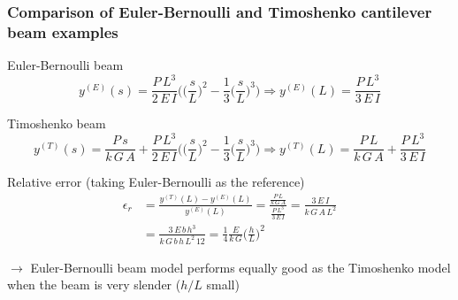 \begin{frame}
  \frametitle{Comparison of Euler-Bernoulli and Timoshenko cantilever beam examples}
  
  Euler-Bernoulli beam
  \begin{displaymath}
    y^{(E)}(s) = \frac{P \, L^3}{2 \, E \, I} \Biggl( \biggl( \frac{s}{L} \biggr)^2 - \frac{1}{3} \biggl( \frac{s}{L} \biggr)^3 \Biggr)
    \Rightarrow y^{(E)}(L) = \frac{P \, L^3}{3 \, E \, I}
  \end{displaymath}
  
  Timoshenko beam
  \begin{displaymath}
    y^{(T)}(s) = \frac{P \, s}{k \, G \, A} + \frac{P \, L^3}{2 \, E \, I} \Biggl( 
      \biggl( \frac{s}{L} \biggr)^2 - \frac{1}{3} \biggl( \frac{s}{L} \biggr)^3 \Biggr)
      \Rightarrow y^{(T)}(L) = \frac{P \, L}{k \, G \, A} + \frac{P \, L^3}{3 \, E \, I}
  \end{displaymath}
  
  Relative error (taking Euler-Bernoulli as the reference)
  \begin{displaymath}
    \begin{alignedat}{1}
      \epsilon_r &= \frac{y^{(T)}(L) - y^{(E)}(L)}{y^{(E)}(L)} = \frac{\frac{P \, L}{k \, G \, A}}{\frac{P \, L^3}{3 \, E \, I}} = \frac{3 \, E \, I}{k \, G \, A \, L^2} \\
      &= \frac{3 \, E \, b \, h^3}{k \, G \, b \, h \, L^2 \, 12} = \frac{1}{4} \frac{E}{k \, G} \biggl( \frac{h}{L} \biggr)^2
    \end{alignedat}
  \end{displaymath}
  \begin{center}
    $\rightarrow$ Euler-Bernoulli beam model performs equally good as the Timoshenko model \newline when the beam is very slender ($h/L$ small)
  \end{center}
  
\end{frame}


